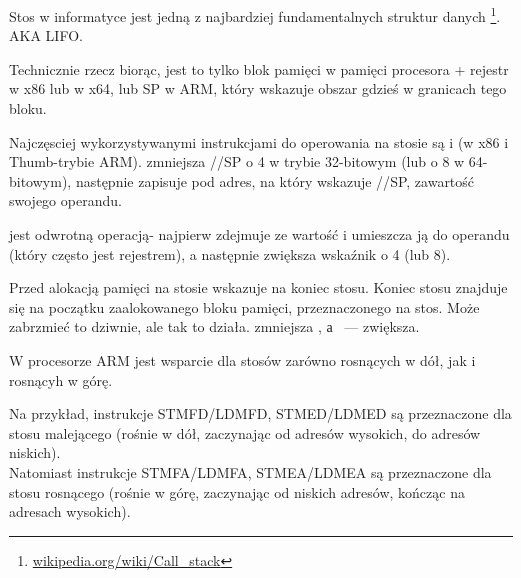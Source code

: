\mysection{\Stack}
\label{sec:stack}
\myindex{\Stack}

Stos w informatyce jest jedną z najbardziej fundamentalnych struktur danych
\footnote{\href{http://go.yurichev.com/17119}{wikipedia.org/wiki/Call\_stack}}.
\ac{AKA} \ac{LIFO}.

Technicznie rzecz biorąc, jest to tylko blok pamięci w pamięci procesora + rejestr \ESP w x86 lub \RSP w x64, lub \ac{SP} w ARM, który wskazuje obszar gdzieś w granicach tego bloku.

Najczęsciej wykorzystywanymi instrukcjami do operowania na stosie są \PUSH i \POP (w x86 i Thumb-trybie ARM). 
\PUSH zmniejsza \ESP/\RSP/\ac{SP} o 4 w trybie 32-bitowym (lub o 8 w 64-bitowym),
następnie zapisuje pod adres, na który wskazuje \ESP/\RSP/\ac{SP}, zawartość swojego operandu.

\POP jest odwrotną operacją- najpierw zdejmuje ze  wartość i umieszcza ją do operandu 
(który często jest rejestrem), a następnie zwiększa wskaźnik o 4 (lub 8).

Przed alokacją pamięci na stosie  wskazuje na koniec stosu.
Koniec stosu znajduje się na początku zaalokowanego bloku pamięci, przeznaczonego na stos. Może zabrzmieć to dziwnie, ale tak to działa.
\PUSH zmniejsza , а \POP~--- zwiększa.

W procesorze ARM jest wsparcie dla stosów zarówno rosnących w dół, jak i rosnącyh w górę.


Na przykład, instrukcje \ac{STMFD}/\ac{LDMFD}, \ac{STMED}/\ac{LDMED} są przeznaczone dla stosu malejącego (rośnie w dół, zaczynając od adresów wysokich, do adresów niskich).\\
Natomiast instrukcje \ac{STMFA}/\ac{LDMFA}, \ac{STMEA}/\ac{LDMEA} są przeznaczone dla stosu rosnącego (rośnie w górę, zaczynając od niskich adresów, kończąc na adresach wysokich).


